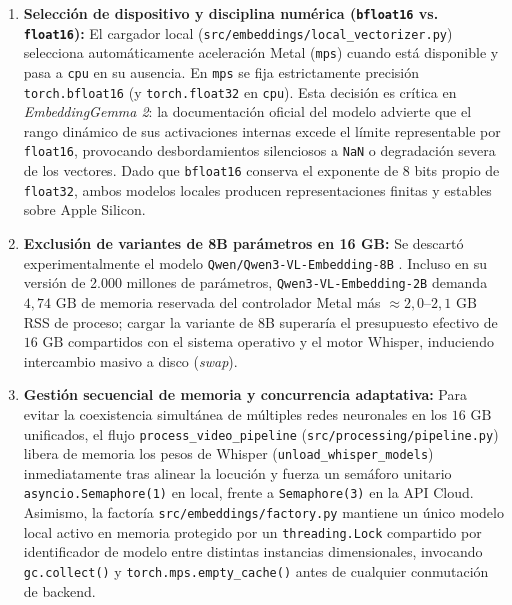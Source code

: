 \begin{enumerate}
    \item \textbf{Selección de dispositivo y disciplina numérica (\texttt{bfloat16} vs. \texttt{float16}):} El cargador local (\texttt{src/\allowbreak embeddings/\allowbreak local\_\allowbreak vectorizer.py}) selecciona automáticamente aceleración Metal (\texttt{mps}) cuando está disponible y pasa a \texttt{cpu} en su ausencia. En \texttt{mps} se fija estrictamente precisión \texttt{torch.bfloat16} (y \texttt{torch.float32} en \texttt{cpu}). Esta decisión es crítica en \textit{EmbeddingGemma 2}: la documentación oficial del modelo \cite{hf_embeddinggemma2} advierte que el rango dinámico de sus activaciones internas excede el límite representable por \texttt{float16}, provocando desbordamientos silenciosos a \texttt{NaN} o degradación severa de los vectores. Dado que \texttt{bfloat16} conserva el exponente de 8 bits propio de \texttt{float32}, ambos modelos locales producen representaciones finitas y estables sobre Apple Silicon.

    \item \textbf{Exclusión de variantes de 8B parámetros en 16 GB:} Se descartó experimentalmente el modelo \texttt{Qwen/\allowbreak Qwen3-VL-Embedding-8B} \cite{hf_qwen3_8b}. Incluso en su versión de 2.000 millones de parámetros, \texttt{Qwen3-VL-Embedding-2B} demanda $4,74\text{ GB}$ de memoria reservada del controlador Metal más $\approx 2,0\text{--}2,1\text{ GB}$ RSS de proceso; cargar la variante de 8B superaría el presupuesto efectivo de $16\text{ GB}$ compartidos con el sistema operativo y el motor Whisper, induciendo intercambio masivo a disco (\textit{swap}).

    \item \textbf{Gestión secuencial de memoria y concurrencia adaptativa:} Para evitar la coexistencia simultánea de múltiples redes neuronales en los $16\text{ GB}$ unificados, el flujo \texttt{process\_\allowbreak video\_\allowbreak pipeline} (\texttt{src/\allowbreak processing/\allowbreak pipeline.py}) libera de memoria los pesos de Whisper (\texttt{unload\_\allowbreak whisper\_\allowbreak models}) inmediatamente tras alinear la locución y fuerza un semáforo unitario \texttt{asyncio.\allowbreak Semaphore(1)} en local, frente a \texttt{Semaphore(3)} en la API Cloud. Asimismo, la factoría \texttt{src/\allowbreak embeddings/\allowbreak factory.py} mantiene un único modelo local activo en memoria protegido por un \texttt{threading.\allowbreak Lock} compartido por identificador de modelo entre distintas instancias dimensionales, invocando \texttt{gc.collect()} y \texttt{torch.mps.empty\_\allowbreak cache()} antes de cualquier conmutación de backend.


\end{enumerate}
